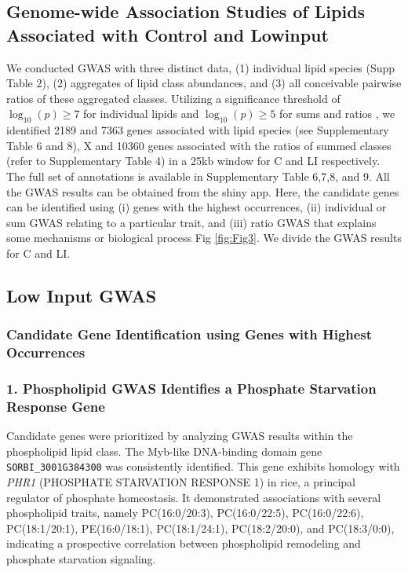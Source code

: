 \documentclass[10pt,letterpaper]{article}
\begin{document}
\begin{itemize}
\subsection*{Genome-wide Association Studies of Lipids Associated with Control and Lowinput}
We conducted GWAS with three distinct data, (1) individual lipid species (Supp Table 2), (2) aggregates of lipid class abundances, and (3) all conceivable pairwise ratios of these aggregated classes. Utilizing a significance threshold of $\log_{10}(p)\ge7$ for individual lipids and $\log_{10}(p)\ge5$ for sums and ratios , we identified 2189 and 7363 genes associated with lipid species (see Supplementary Table 6 and 8), X and 10360  genes associated with the ratios of summed classes (refer to Supplementary Table 4) in a 25kb window for C and LI respectively. The full set of annotations is available in Supplementary Table 6,7,8, and 9. All the GWAS results can be obtained from the shiny app. Here, the candidate genes can be identified using (i) genes with the highest occurrences, (ii) individual or sum GWAS relating to a particular trait, and (iii) ratio GWAS that explains some mechanisms or biological process Fig \ref{fig:Fig3}. We divide the GWAS results for C and LI.



\subsection*{Low Input GWAS}
\subsubsection*{Candidate Gene Identification using Genes with Highest Occurrences}
\subsubsection*{1. Phospholipid GWAS Identifies a Phosphate Starvation Response Gene}
Candidate genes were prioritized by analyzing GWAS results within the phospholipid lipid class. The Myb-like DNA-binding domain gene \texttt{SORBI\_3001G384300} was consistently identified. This gene exhibits homology with \textit{PHR1} (PHOSPHATE STARVATION RESPONSE 1) in rice, a principal regulator of phosphate homeostasis. It demonstrated associations with several phospholipid traits, namely PC(16:0/20:3), PC(16:0/22:5), PC(16:0/22:6), PC(18:1/20:1), PE(16:0/18:1), PC(18:1/24:1), PC(18:2/20:0), and PC(18:3/0:0), indicating a prospective correlation between phospholipid remodeling and phosphate starvation signaling.


\end{itemize}
\end{document}

